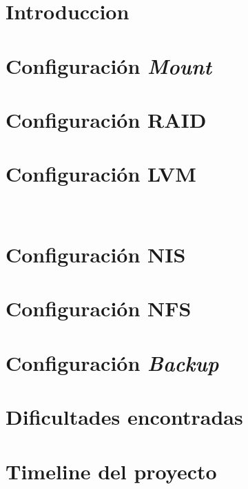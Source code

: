 \documentclass[12pt, spanish, a4paper, hidelinks]{article}
\begin{document}
    \maketitle
    
    \tableofcontents

    \newpage
    \section{Introduccion}
    

    \newpage
    \section{Configuración \textit{Mount}}
    

    \newpage
    \section{Configuración RAID}
    
    
    \newpage
    \section{Configuración LVM}
    
    
    \newpage 
    \section{Configuración NIS}
    
    
    \newpage
    \section{Configuración NFS}
    

    \newpage
    \section{Configuración \textit{Backup}}
    

    \newpage
    \section{Dificultades encontradas}
    

    \newpage
    \section{Timeline del proyecto}
    

    \newpage
    \printbibliography[
        heading=bibintoc,
        title={Bibliografía}
    ]
\end{document}
